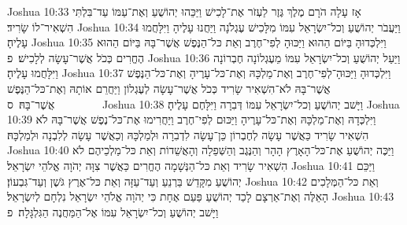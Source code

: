 Joshua 10:33	אָז עָלָה הֹרָם מֶלֶךְ גֶּזֶר לַעְזֹר אֶת־לָכִישׁ וַיַּכֵּהוּ יְהוֹשֻׁעַ וְאֶת־עַמּוֹ עַד־בִּלְתִּי הִשְׁאִיר־לוֹ שָׂרִיד׃
Joshua 10:34	וַיַּעֲבֹר יְהוֹשֻׁעַ וְכל־יִשְׂרָאֵל עִמּוֹ מִלָּכִישׁ עֶגְלֹנָה וַיַּחֲנוּ עָלֶיהָ וַיִּלָּחֲמוּ עָלֶיהָ׃
Joshua 10:35	וַיִּלְכְּדוּהָ בַּיּוֹם הַהוּא וַיַּכּוּהָ לְפִי־חֶרֶב וְאֵת כּל־הַנֶּפֶשׁ אֲשֶׁר־בָּהּ בַּיּוֹם הַהוּא הֶחֱרִים כְּכֹל אֲשֶׁר־עָשָׂה לְלָכִישׁ׃ {פ}
Joshua 10:36	וַיַּעַל יְהוֹשֻׁעַ וְכל־יִשְׂרָאֵל עִמּוֹ מֵעֶגְלוֹנָה חֶבְרוֹנָה וַיִּלָּחֲמוּ עָלֶיהָ׃
Joshua 10:37	וַיִּלְכְּדוּהָ וַיַּכּוּהָ־לְפִי־חֶרֶב וְאֶת־מַלְכָּהּ וְאֶת־כּל־עָרֶיהָ וְאֶת־כּל־הַנֶּפֶשׁ אֲשֶׁר־בָּהּ לֹא־הִשְׁאִיר שָׂרִיד כְּכֹל אֲשֶׁר־עָשָׂה לְעֶגְלוֹן וַיַּחֲרֵם אוֹתָהּ וְאֶת־כּל־הַנֶּפֶשׁ אֲשֶׁר־בָּהּ׃ {ס}        
Joshua 10:38	וַיָּשׁב יְהוֹשֻׁעַ וְכל־יִשְׂרָאֵל עִמּוֹ דְּבִרָה וַיִּלָּחֶם עָלֶיהָ׃
Joshua 10:39	וַיִּלְכְּדָהּ וְאֶת־מַלְכָּהּ וְאֶת־כּל־עָרֶיהָ וַיַּכּוּם לְפִי־חֶרֶב וַיַּחֲרִימוּ אֶת־כּל־נֶפֶשׁ אֲשֶׁר־בָּהּ לֹא הִשְׁאִיר שָׂרִיד כַּאֲשֶׁר עָשָׂה לְחֶבְרוֹן כֵּן־עָשָׂה לִדְבִרָה וּלְמַלְכָּהּ וְכַאֲשֶׁר עָשָׂה לְלִבְנָה וּלְמַלְכָּהּ׃
Joshua 10:40	וַיַּכֶּה יְהוֹשֻׁעַ אֶת־כּל־הָאָרֶץ הָהָר וְהַנֶּגֶב וְהַשְּׁפֵלָה וְהָאֲשֵׁדוֹת וְאֵת כּל־מַלְכֵיהֶם לֹא הִשְׁאִיר שָׂרִיד וְאֵת כּל־הַנְּשָׁמָה הֶחֱרִים כַּאֲשֶׁר צִוָּה יְהֹוָה אֱלֹהֵי יִשְׂרָאֵל׃
Joshua 10:41	וַיַּכֵּם יְהוֹשֻׁעַ מִקָּדֵשׁ בַּרְנֵעַ וְעַד־עַזָּה וְאֵת כּל־אֶרֶץ גֹּשֶׁן וְעַד־גִּבְעוֹן׃
Joshua 10:42	וְאֵת כּל־הַמְּלָכִים הָאֵלֶּה וְאֶת־אַרְצָם לָכַד יְהוֹשֻׁעַ פַּעַם אֶחָת כִּי יְהֹוָה אֱלֹהֵי יִשְׂרָאֵל נִלְחָם לְיִשְׂרָאֵל׃
Joshua 10:43	וַיָּשׁב יְהוֹשֻׁעַ וְכל־יִשְׂרָאֵל עִמּוֹ אֶל־הַמַּחֲנֶה הַגִּלְגָּלָה׃ {פ}
